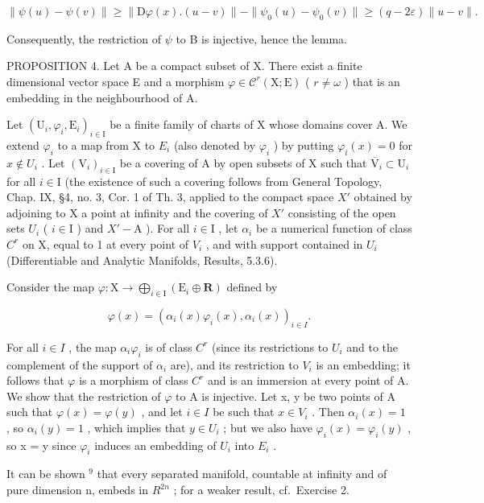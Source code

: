 \[
\| \psi (u) - \psi (v) \| \geq \| \mathrm{D} \varphi (x). (u - v) \| - \| \psi_ {0} (u) - \psi_ {0} (v) \| \geq (q - 2 \varepsilon) \| u - v \|.
\]

Consequently, the restriction of \(\psi\) to B is injective, hence the lemma.

PROPOSITION 4. Let A be a compact subset of X. There exist a finite dimensional vector space E and a morphism \(\varphi \in \mathcal{C}^r (\mathrm{X};\mathrm{E})\) ( \(r\neq \omega\) ) that is an embedding in the neighbourhood of A.

Let \((\mathrm{U}_{i},\varphi_{i},\mathrm{E}_{i})_{i\in\mathrm{I}}\) be a finite family of charts of X whose domains cover A. We extend \(\varphi_{i}\) to a map from X to \(E_{i}\) (also denoted by \(\varphi_{i}\) ) by putting \(\varphi_{i}(x)=0\) for \(x\notin U_{i}\) . Let \((\mathrm{V}_{i})_{i\in\mathrm{I}}\) be a covering of A by open subsets of X such that \(\overline{\mathrm{V}}_{i}\subset\mathrm{U}_{i}\) for all \(i\in\mathrm{I}\) (the existence of such a covering follows from General Topology, Chap. IX, §4, no. 3, Cor. 1 of Th. 3, applied to the compact space \(X'\) obtained by adjoining to X a point at infinity and the covering of \(X'\) consisting of the open sets \(U_{i}\) ( \(i\in\mathrm{I}\) ) and \(X'-\mathrm{A}\) ). For all \(i\in\mathrm{I}\) , let \(\alpha_{i}\) be a numerical function of class \(C^{r}\) on X, equal to 1 at every point of \(V_{i}\) , and with support contained in \(U_{i}\) (Differentiable and Analytic Manifolds, Results, 5.3.6).

Consider the map \(\varphi : \mathrm{X} \to \bigoplus_{i \in \mathrm{I}} (\mathrm{E}_i \oplus \mathbf{R})\) defined by

\[
\varphi (x) = (\alpha_ {i} (x) \varphi_ {i} (x), \alpha_ {i} (x)) _ {i \in I}.
\]

For all \(i \in I\) , the map \(\alpha_{i}\varphi_{i}\) is of class \(C^{r}\) (since its restrictions to \(U_{i}\) and to the complement of the support of \(\alpha_{i}\) are), and its restriction to \(V_{i}\) is an embedding; it follows that \(\varphi\) is a morphism of class \(C^{r}\) and is an immersion at every point of A. We show that the restriction of \(\varphi\) to A is injective. Let x, y be two points of A such that \(\varphi(x) = \varphi(y)\) , and let \(i \in I\) be such that \(x \in V_{i}\) . Then \(\alpha_{i}(x) = 1\) , so \(\alpha_{i}(y) = 1\) , which implies that \(y \in U_{i}\) ; but we also have \(\varphi_{i}(x) = \varphi_{i}(y)\) , so x = y since \(\varphi_{i}\) induces an embedding of \(U_{i}\) into \(E_{i}\) .

It can be shown \(^{9}\) that every separated manifold, countable at infinity and of pure dimension n, embeds in \(R^{2n}\) ; for a weaker result, cf.~Exercise 2.

